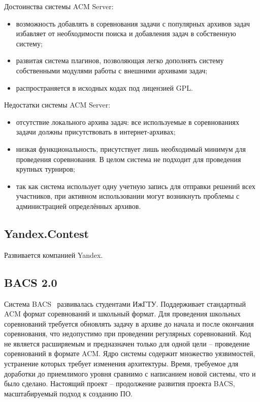 Достоинства системы ACM Server:
\begin{itemize}
    \item возможность добавлять в соревнования задачи с популярных архивов задач
        избавляет от необходимости поиска и добавления задач в собственную систему;
    \item развитая система плагинов, позволяющая легко дополнять систему
        собственными модулями работы с внешними архивами задач;
    \item распространяется в исходных кодах под лицензией GPL.
\end{itemize}

Недостатки системы ACM Server:
\begin{itemize}
    \item отсутствие локального архива задач:
        все используемые в соревнованиях задачи должны присутствовать в интернет-архивах;
    \item низкая функциональность, присутствует лишь необходимый минимум для проведения соревнования.
        В целом система не подходит для проведения крупных турниров;
    \item так как система использует одну учетную запись для отправки решений всех участников,
        при активном использовании могут возникнуть проблемы с администрацией определённых архивов.
\end{itemize}

\subsection{Yandex.Contest}
Развивается компанией Yandex.

\subsection{BACS 2.0}
Система BACS~\cite{bacs2} развивалась студентами ИжГТУ.
Поддерживает стандартный ACM формат соревнований и школьный формат.
Для проведения школьных соревнований требуется обновлять задачу в архиве до начала и после окончания соревнования,
что недопустимо при проведении регулярных соревнований.
Код не является расширяемым и предназначен только для одной цели -- проведение соревнований в формате ACM.
Ядро системы содержит множество уязвимостей, устранение которых требует изменения архитектуры.
Время, требуемое для доработки до приемлимого уровня сравнимо с написанием новой системы, что и было сделано.
Настоящий проект -- продолжение развития проекта BACS, масштабируемый подход к созданию ПО.

